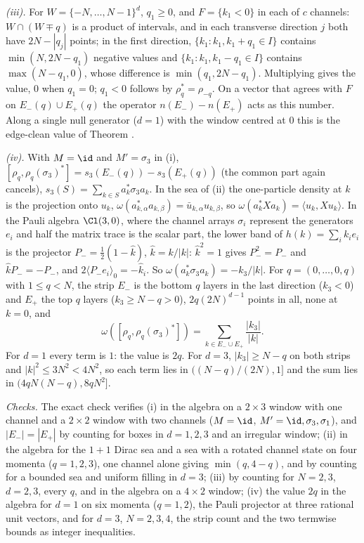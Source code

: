 \emph{(iii).} For $W = \{-N, \dots, N - 1\}^{d}$, $q_{1} \ge 0$, and $F = \{k_{1} < 0\}$ in each of $c$ channels: $W \cap (W \mp q)$ is a product of intervals, and in each transverse direction $j$ both have $2N - |q_{j}|$ points; in the first direction, $\{k_{1} : k_{1}, k_{1} + q_{1} \in I\}$ contains $\min(N, 2N - q_{1})$ negative values and $\{k_{1} : k_{1}, k_{1} - q_{1} \in I\}$ contains $\max(N - q_{1}, 0)$, whose difference is $\min(q_{1}, 2N - q_{1})$. Multiplying gives the value, $0$ when $q_{1} = 0$; $q_{1} < 0$ follows by $\rho_{q}^{*} = \rho_{-q}$. On a vector that agrees with $F$ on $E_{-}(q) \cup E_{+}(q)$ the operator $n(E_{-}) - n(E_{+})$ acts as this number. Along a single null generator ($d = 1$) with the window centred at $0$ this is the edge-clean value of Theorem .

\emph{(iv).} With $M = \id$ and $M' = \sigma_{3}$ in (i), $[\rho_{q}, \rho_{q}(\sigma_{3})^{*}] = s_{3}(E_{-}(q)) - s_{3}(E_{+}(q))$ (the common part again cancels), $s_{3}(S) = \sum_{k\in S}a_{k}^{*}\sigma_{3}a_{k}$. In the sea of (ii) the one-particle density at $k$ is the projection onto $u_{k}$, $\omega(a_{k,\alpha}^{*}a_{k,\beta}) = \bar u_{k,\alpha}u_{k,\beta}$, so $\omega(a_{k}^{*}Xa_{k}) = \langle u_{k}, Xu_{k}\rangle$. In the Pauli algebra $\Cl(3,0)$, where the channel arrays $\sigma_{i}$ represent the generators $e_{i}$ and half the matrix trace is the scalar part, the lower band of $h(k) = \sum_{i}k_{i}e_{i}$ is the projector $P_{-} = \tfrac12(1 - \hat k)$, $\hat k = k/|k|$: $\hat k^{2} = 1$ gives $P_{-}^{2} = P_{-}$ and $\hat kP_{-} = -P_{-}$, and $2\langle P_{-}e_{i}\rangle_{0} = -\hat k_{i}$. So $\omega(a_{k}^{*}\sigma_{3}a_{k}) = -k_{3}/|k|$. For $q = (0, \dots, 0, q)$ with $1 \le q < N$, the strip $E_{-}$ is the bottom $q$ layers in the last direction ($k_{3} < 0$) and $E_{+}$ the top $q$ layers ($k_{3} \ge N - q > 0$), $2q(2N)^{d-1}$ points in all, none at $k = 0$, and
\[
\omega([\rho_{q}, \rho_{q}(\sigma_{3})^{*}]) = \sum_{k\in E_{-}\cup E_{+}}\frac{|k_{3}|}{|k|} .
\]
For $d = 1$ every term is $1$: the value is $2q$. For $d = 3$, $|k_{3}| \ge N - q$ on both strips and $|k|^{2} \le 3N^{2} < 4N^{2}$, so each term lies in $((N - q)/(2N), 1]$ and the sum lies in $(4qN(N - q), 8qN^{2}]$.

\emph{Checks.} The exact check verifies (i) in the algebra on a $2\times3$ window with one channel and a $2\times2$ window with two channels ($M = \id$, $M' = \id, \sigma_{3}, \sigma_{1}$), and $|E_{-}| = |E_{+}|$ by counting for boxes in $d = 1, 2, 3$ and an irregular window; (ii) in the algebra for the $1 + 1$ Dirac sea and a sea with a rotated channel state on four momenta ($q = 1, 2, 3$), one channel alone giving $\min(q, 4 - q)$, and by counting for a bounded sea and uniform filling in $d = 3$; (iii) by counting for $N = 2, 3$, $d = 2, 3$, every $q$, and in the algebra on a $4\times2$ window; (iv) the value $2q$ in the algebra for $d = 1$ on six momenta ($q = 1, 2$), the Pauli projector at three rational unit vectors, and for $d = 3$, $N = 2, 3, 4$, the strip count and the two termwise bounds as integer inequalities.
